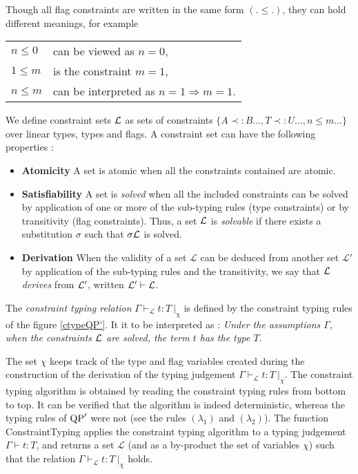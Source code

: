 Though all flag constraints are written in the same form $(. \le .)$, they can hold different meanings, for example
	\begin{center}
	\begin{tabular}{ll}
		$n \le 0$ & can be viewed as $n = 0$, \\
 		$1 \le m$ & is the constraint $m = 1$, \\
 		$n \le m$ & can be interpreted as $n = 1 \Rightarrow m = 1$.
 	\end{tabular}
 	\end{center}

\begin{defn} We define constraint sets $\mathcal{L}$ as sets of constraints $\{ A \prec: B \dots, T \prec: U \dots, n \le m \dots\}$
	over linear types, types and flags.
  A constraint set can have the following properties :
  \begin{itemize}
  	\item[]{\bf Atomicity} A set is atomic when all the constraints contained are atomic.
  	\item[]{\bf Satisfiability} A set is \textit{solved} when all the included constraints can be solved by application of one or
  		more of the sub-typing rules (type constraints) or by transitivity (flag constraints).
  		Thus, a set $\mathcal{L}$ is \textit{solvable} if there exists a substitution $\sigma$ such that $\sigma \mathcal{L}$ is solved.
	 	\item[]{\bf Derivation} When the validity of a set $\mathcal{L}$ can be deduced from another set $\mathcal{L'}$ by application of
		  the sub-typing rules and the transitivity, we say that $\mathcal{L}$ \textit{derives} from $\mathcal{L}'$,
		  written $\mathcal{L}' \vdash \mathcal{L}$.
  \end{itemize}
\end{defn}

\begin{defn} The \textit{constraint typing relation} $\Gamma \vdash_\mathcal{L} t : T ~|_\chi$ is defined by the constraint typing rules
	of the figure \ref{ctypeQP'}. It it to be interpreted as : \textit{Under the assumptions $\Gamma$, when the constraints $\mathcal{L}$ are solved,
	the term $t$ has the type $T$}. 
\end{defn}

The set $\chi$ keeps track of the type and flag variables created during the construction of the derivation
of the typing judgement $\Gamma \vdash_\mathcal{L} t : T ~|_\chi$. The constraint typing algorithm is obtained by reading the
constraint typing rules from bottom to top. It can be verified that the algorithm is indeed deterministic, whereas the typing
rules of ${\rm QP}'$ were not (see the rules $(\lambda_1)$ and $(\lambda_2)$). The function ConstraintTyping applies the constraint
typing algorithm to a typing judgement $\Gamma \vdash t : T$, and returns a set $\mathcal{L}$ (and as a by-product the set of
variables $\chi$) such that the relation $\Gamma \vdash_\mathcal{L} t : T ~|_\chi$ holds.
	
